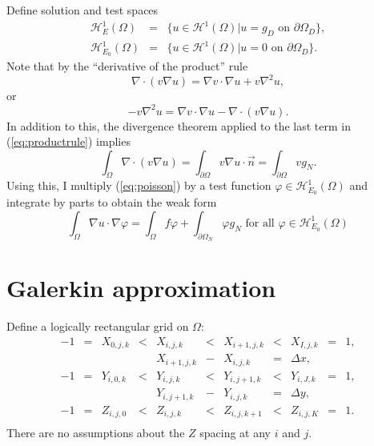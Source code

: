 \documentclass{article}
\begin{document}
Define solution and test spaces
\begin{eqnarray*}
  \mathcal{H}_E^1 (\Omega) & = & \{ u \in \mathcal{H}^1 (\Omega) | u = g_D
  \text{ on } \partial \Omega_D \},\\
  \mathcal{H}^1_{E_0} (\Omega) & = & \{ u \in \mathcal{H}^1 (\Omega) | u = 0
  \text{ on } \partial \Omega_D \} .
\end{eqnarray*}
Note that by the ``derivative of the product'' rule
\[ \nabla \cdot (v \nabla u) = \nabla v \cdot \nabla u + v \nabla^2 u, \]
or
\begin{equation}
  - v \nabla^2 u = \nabla v \cdot \nabla u - \nabla \cdot (v \nabla u) .
  \label{eq:productrule}
\end{equation}
In addition to this, the divergence theorem applied to the last term in
(\ref{eq:productrule}) implies
\[ \int_{\Omega} \nabla \cdot (v \nabla u) = \int_{\partial \Omega} v \nabla
   u \cdot \vec{n} = \int_{\partial \Omega} v g_N . \]
Using this, I multiply (\ref{eq:poisson}) by a test function $\varphi \in
\mathcal{H}^1_{E_0} (\Omega)$ and integrate by parts to obtain the weak form
\begin{equation}
  \int_{\Omega} \nabla u \cdot \nabla \varphi = \int_{\Omega} f \varphi +
  \int_{\partial \Omega_N} \varphi g_N  \text{ for all } \varphi \in
  \mathcal{H}^1_{E_0} (\Omega) \label{eq:weakpoisson}
\end{equation}

\section{Galerkin approximation}

Define a logically rectangular grid on $\Omega$:
\begin{equation*}
\begin{array}{lllllllllll}
  - 1 & = & X_{0, j, k} & < & X_{i, j, k} & < & X_{i + 1, j, k} & < & X_{I, j, k} & = & 1,\\
  &  &  &  & X_{i + 1, j, k} & - & X_{i, j, k} & = & \Delta x, &  & \\
  - 1 & = & Y_{i, 0, k} & < & Y_{i, j, k} & < & Y_{i, j + 1, k} & < & Y_{i, J, k} & = & 1,\\
  &  &  &  & Y_{i, j + 1, k} & - & Y_{i, j, k} & = & \Delta y, &  & \\
  - 1 & = & Z_{i, j, 0} & < & Z_{i, j, k} & < & Z_{i, j, k + 1} & < & Z_{i, j, K} & = & 1.\\
\end{array}
\end{equation*}
There are no assumptions about the $Z$ spacing at any $i$ and $j$.
\end{document}
